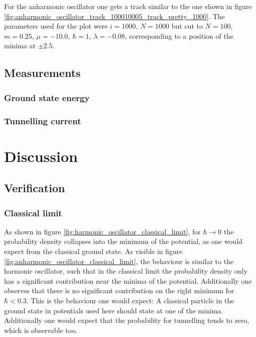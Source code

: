 \documentclass{scrartcl}
\begin{document}
		For the anharmonic oscillator one gets a track similar to the one shown in figure \ref{fig:anharmonic_oscillator_track_100010005_track_pretty_1000}.
		The parameters used for the plot were $i=1000$, $N=1000$ but cut to $N=100$, $m=0.25$, $\mu = -10.0$, $\hbar = 1$, $\lambda = -0.08$, corresponding to a position of the minima at $\pm 2.5$.
	\subsection{Measurements}
	\subsubsection{Ground state energy}
	\subsubsection{Tunnelling current}
	\section{Discussion}
	\subsection{Verification}
	\subsubsection{Classical limit}
		As shown in figure \ref{fig:harmonic_oscillator_classical_limit}, for $\hbar \rightarrow 0$ the probability density collapses into the minimum of the potential, as one would expect from the classical ground state.
		As visible in figure \ref{fig:anharmonic_oscillator_classical_limit}, the behaviour is similar to the harmonic oscillator, such that in the classical limit the probability density only has a significant contribution near the minima of the potential.
		Additionally one observes that there is no significant contribution on the right minimum for $\hbar < 0.3$.
		This is the behaviour one would expect:
		A classical particle in the ground state in potentials used here should state at one of the minima.
		Additionally one would expect that the probability for tunnelling tends to zero, which is observable too.
\end{document}
